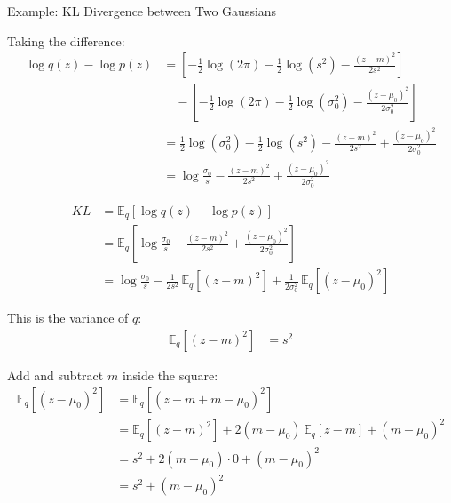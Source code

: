 \documentclass[aspectratio=169,xcolor=dvipsnames,svgnames,x11names,fleqn]{beamer}
\begin{document}
\begin{frame}[allowframebreaks]{Example: KL Divergence between Two Gaussians}
\begin{tcolorbox}[colframe=theoryBlue, breakable]
 \end{tcolorbox}

\pause


\begin{tcolorbox}[colframe=theoryBlue, breakable]

Taking the difference:
\begin{align*}
    \log q(z) - \log p(z)
    &= \left[-\frac{1}{2}\log(2\pi) - \frac{1}{2}\log(s^2) - \frac{(z-m)^2}{2s^2}\right] \\
    &\quad - \left[-\frac{1}{2}\log(2\pi) - \frac{1}{2}\log(\sigma_0^2) - \frac{(z-\mu_0)^2}{2\sigma_0^2}\right] \\[6pt]
    &= \frac{1}{2}\log(\sigma_0^2) - \frac{1}{2}\log(s^2)
       - \frac{(z-m)^2}{2s^2} + \frac{(z-\mu_0)^2}{2\sigma_0^2} \\[6pt]
    &= \log\frac{\sigma_0}{s}
       - \frac{(z-m)^2}{2s^2}
       + \frac{(z-\mu_0)^2}{2\sigma_0^2}
\end{align*}

 \end{tcolorbox}

\pause


\begin{tcolorbox}[colframe=theoryBlue, breakable]

\begin{align*}
    KL
    &= \mathbb{E}_q\!\left[\log q(z) - \log p(z)\right] \\
    &= \mathbb{E}_q\!\left[
         \log\frac{\sigma_0}{s}
         - \frac{(z-m)^2}{2s^2}
         + \frac{(z-\mu_0)^2}{2\sigma_0^2}
       \right] \\[6pt]
    &= \log\frac{\sigma_0}{s}
       - \frac{1}{2s^2}\,\mathbb{E}_q\!\left[(z-m)^2\right]
       + \frac{1}{2\sigma_0^2}\,\mathbb{E}_q\!\left[(z-\mu_0)^2\right]
\end{align*}
 
 
  \end{tcolorbox}

\pause


\begin{tcolorbox}[colframe=theoryBlue, breakable]
 
 This is the variance of $q$:
\begin{align*}
    \mathbb{E}_q\!\left[(z - m)^2\right] &= s^2
\end{align*}
 
 
 Add and subtract $m$ inside the square:
\begin{align*}
    \mathbb{E}_q\!\left[(z - \mu_0)^2\right]
    &= \mathbb{E}_q\!\left[(z - m + m - \mu_0)^2\right] \\
    &= \mathbb{E}_q\!\left[(z-m)^2\right]
       + 2(m-\mu_0)\,\mathbb{E}_q\!\left[z - m\right]
       + (m - \mu_0)^2 \\
    &= s^2 + 2(m - \mu_0) \cdot 0 + (m - \mu_0)^2 \\
    &= s^2 + (m - \mu_0)^2
\end{align*}
 

\end{tcolorbox}
\end{frame}
\end{document}
